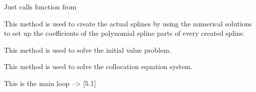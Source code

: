 \documentclass[letterpaper,10pt,english]{sphinxmanual}
\begin{document}
\begin{fulllineitems}
\begin{fulllineitems}
\label{pytrajectory:pytrajectory.trajectory.Trajectory.plot}
Just calls {\hyperref[pytrajectory:pytrajectory.trajectory.Trajectory.plot]{}} function from 

\end{fulllineitems}


\begin{fulllineitems}
\label{pytrajectory:pytrajectory.trajectory.Trajectory.setCoeff}
This method is used to create the actual splines by using the numerical
solutions to set up the coefficients of the polynomial spline parts of
every created spline.

\end{fulllineitems}


\begin{fulllineitems}
\label{pytrajectory:pytrajectory.trajectory.Trajectory.simulate}
This method is used to solve the initial value problem.

\end{fulllineitems}


\begin{fulllineitems}
\label{pytrajectory:pytrajectory.trajectory.Trajectory.solve}
This method is used to solve the collocation equation system.

\end{fulllineitems}


\begin{fulllineitems}
\label{pytrajectory:pytrajectory.trajectory.Trajectory.startIteration}
This is the main loop --\textgreater{} {[}5.1{]}

\end{fulllineitems}



\end{fulllineitems}
\end{document}
